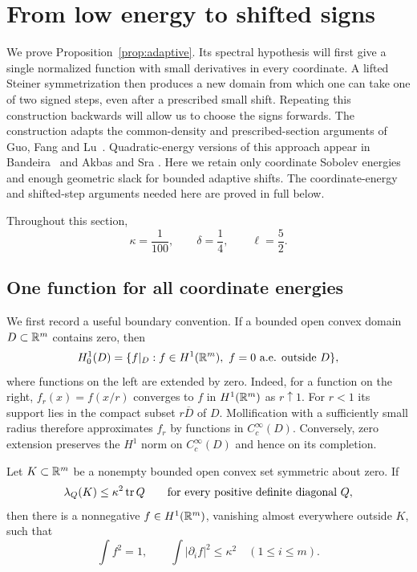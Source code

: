 \section{From low energy to shifted signs}\label{sec:shifted-signs}

We prove Proposition~\ref{prop:adaptive}. Its spectral hypothesis will first
give a single normalized function with small derivatives in every coordinate. A lifted
Steiner symmetrization then produces a new domain from which one can take
one of two signed steps, even after a prescribed small shift. Repeating
this construction backwards will allow us to choose the signs forwards.
The construction adapts the common-density and prescribed-section arguments
of Guo, Fang and Lu~\cite[Proposition~2.2, Lemmas~3.3--3.4 and~4.1--4.3]{GuoFangLu2026}.
Quadratic-energy versions of this approach appear in
Bandeira~\cite{Bandeira2026} and Akbas and Sra
\cite[Lemmas~2.2--2.3]{AkbasSra2026}. Here we retain only coordinate Sobolev
energies and enough geometric slack for bounded adaptive shifts.
The coordinate-energy and shifted-step arguments needed here are proved
in full below.

Throughout this section,
\[
 \kappa=\frac1{100},\qquad \delta=\frac14,\qquad \ell=\frac52.
\]

\subsection{One function for all coordinate energies}

We first record a useful boundary convention. If a bounded open convex
domain $D\subset\mathbb R^m$ contains zero, then
\begin{equation}\label{eq:zero-extension}
 H_0^1(D)=\{f|_D:f\in H^1(\mathbb R^m),\ f=0\text{ a.e. outside }D\},
\end{equation}
where functions on the left are extended by zero. Indeed, for a function on
the right, $f_r(x)=f(x/r)$ converges to $f$ in $H^1(\mathbb R^m)$ as $r\uparrow1$.
For $r<1$ its support lies in the compact subset $r\overline D$ of $D$.
Mollification with a sufficiently small radius therefore approximates $f_r$
by functions in $C_c^\infty(D)$. Conversely, zero extension preserves the
$H^1$ norm on $C_c^\infty(D)$ and hence on its completion.

\begin{lemma}\label{lem:simultaneous-density}
Let $K\subset\mathbb R^m$ be a nonempty bounded open convex set symmetric about
zero. If
\[
 \lambda_Q(K)\le\kappa^2\operatorname{tr} Q
 \qquad\text{for every positive definite diagonal }Q,
\]
then there is a nonnegative $f\in H^1(\mathbb R^m)$, vanishing almost everywhere
outside $K$, such that
\[
 \int f^2=1,\qquad \int|\partial_i f|^2\le\kappa^2
 \quad(1\le i\le m).
\]
\end{lemma}

